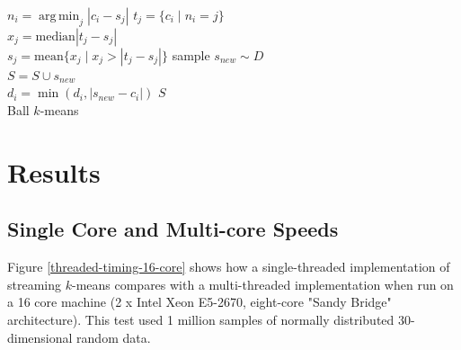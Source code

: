 \documentclass[11pt]{amsart}
\DeclareMathOperator{\argmin}{arg\,min}
\begin{document}
\begin{algorithm}[H]
\SetNoFillComment
{}
 {
$ n_i = \argmin_j | c_i - s_j | $
}
 {
$t_j = \lbrace c_i \mid n_i = j \rbrace $ \\
$x_j = \mathrm{median} | t_j - s_j | $\\
$s_j = \mathrm{mean} \lbrace x_j \mid x_j > | t_j - s_j |   \rbrace$
}
 {
sample $s_{new} \sim D$ \\
$S = S \cup s_{new}$ \\
 {
$d_i = \min (d_i , | s_{new} - c_i |)$
}
}
\Return $ S $\\
\caption{Ball $k$-means}
\end{algorithm}

\section{Results}

\subsection{Single Core and Multi-core Speeds}

Figure \ref{threaded-timing-16-core} shows how a single-threaded implementation of streaming $k$-means compares with a multi-threaded implementation when run on a 16 core machine (2 x Intel Xeon E5-2670, eight-core "Sandy Bridge" architecture).  This test used 1 million samples of normally distributed 30-dimensional random data.  
\end{document}
